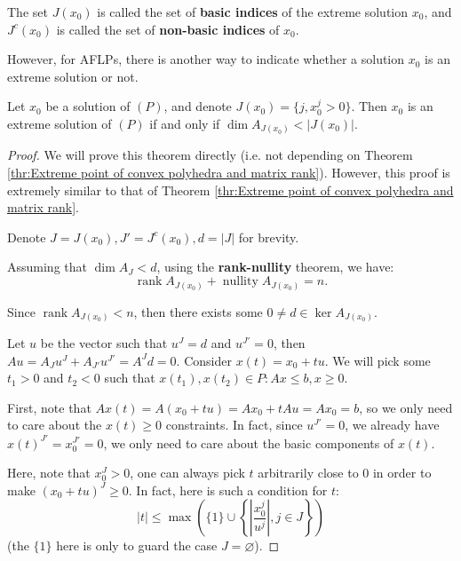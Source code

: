 The set \( J(x_{0}) \) is called the set of \textbf{basic indices} of the
extreme solution \( x_{0} \), and \( J^{c}(x_{0}) \) is called the set of
\textbf{non-basic indices} of \( x_{0} \).

However, for AFLPs, there is another way to indicate whether a solution \( x_{0}
\) is an extreme solution or not.

\begin{theorem}
\label{thr:Linear independent condition of basic columns for extreme solutions}
  Let \( x_{0} \) be a solution of \( (P) \), and denote \( J(x_{0}) = \{j,
  x_{0}^{j} > 0\}   \). Then \( x_{0} \) is an extreme solution of \( (P) \) if
  and only if \( \dim A_{J(x_{0})} < |J(x_{0})| \).
\end{theorem}

\begin{proof}
  We will prove this theorem directly (i.e. not depending on Theorem
  \ref{thr:Extreme point of convex polyhedra and matrix rank}). However, this
  proof is extremely similar to that of Theorem \ref{thr:Extreme point of convex
  polyhedra and matrix rank}.

  Denote \( J = J(x_{0}), J' = J^{c}(x_{0}), d = |J| \) for brevity.

  Assuming that \( \dim A_{J} < d \), using the \textbf{rank-nullity} theorem,
  we have:
  \[
    \operatorname{rank} A_{J(x_{0})} + \operatorname{nullity} A_{J(x_{0})} = n
  .\]

  Since \( \operatorname{rank} A_{J(x_{0})} < n \), then there exists some \( 0
  \neq d \in \operatorname{ker} A_{J(x_{0})}\).

  Let \( u \) be the vector such that \( u^{J} = d \) and \( u^{J'} = 0 \), then
  \( Au = A_{J}u^{J} + A_{J'}u^{J'} = A^{J}d = 0 \).
  Consider \( x(t) = x_{0} + tu \). We will pick some \( t_{1} > 0 \) and \(
  t_{2} < 0 \) such that \( x(t_{1}), x(t_{2}) \in P: Ax \le b, x \ge 0 \).

  First, note that \( Ax(t) = A(x_{0} + tu) = Ax_{0} + tAu = Ax_{0} = b \), so
  we only need to care about the \( x(t) \ge 0  \) constraints. In fact, since
  \( u^{J'} = 0\), we already have \( x(t)^{J'} = x_{0}^{J'} = 0 \), we only
  need to care about the basic components of \( x(t) \).

  Here, note that \( x_{0}^{J} > 0 \), one can always pick \( t \) arbitrarily
  close to \( 0 \) in order to make \( (x_{0}+tu)^{J} \ge 0 \). In fact, here is
  such a condition for \( t \):
  \[
    |t| \le \max \left(  \{1\} \cup \left\{   \left| \frac{x_{0}^{j}}{u^{j}} \right|, j
    \in J\right\}  \right)
  \] (the \( \{1\}   \) here is only to guard the case \( J = \varnothing \)).


\end{proof}
